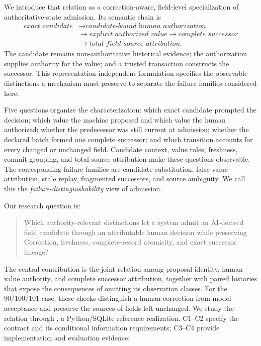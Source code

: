 We introduce that relation as a correction-aware, field-level specialization of authoritative-state admission. Its semantic chain is
\begin{equation}
\begin{aligned}
\textit{exact candidate}
&\rightarrow\textit{candidate-bound human authorization}\\
&\rightarrow\textit{explicit authorized value}
\rightarrow\textit{complete successor}\\
&\rightarrow\textit{total field-source attribution}.
\end{aligned}
\label{eq:admission-chain}
\end{equation}
The candidate remains non-authoritative historical evidence; the authorization supplies authority for the value; and a trusted transaction constructs the successor. This representation-independent formulation specifies the observable distinctions a mechanism must preserve to separate the failure families considered here.

Five questions organize the characterization: which exact candidate prompted the decision; which value the machine proposed and which value the human authorized; whether the predecessor was still current at admission; whether the declared batch formed one complete successor; and which transition accounts for every changed or unchanged field. Candidate context, value roles, freshness, commit grouping, and total source attribution make these questions observable. The corresponding failure families are candidate substitution, false value attribution, stale replay, fragmented successors, and source ambiguity. We call this the \emph{failure-distinguishability} view of admission.

Our research question is:

\begin{quote}
Which authority-relevant distinctions let a system admit an AI-derived field candidate through an attributable human decision while preserving Correction, freshness, complete-record atomicity, and exact successor lineage?
\end{quote}

The central contribution is the joint relation among proposal identity, human value authority, and complete successor attribution, together with paired histories that expose the consequences of omitting its observation classes. For the 90/100/101 case, these checks distinguish a human correction from model acceptance and preserve the sources of fields left unchanged. We study the relation through \system{}, a Python/SQLite reference realization. C1--C2 specify the contract and its conditional information requirements; C3--C4 provide implementation and evaluation evidence:

